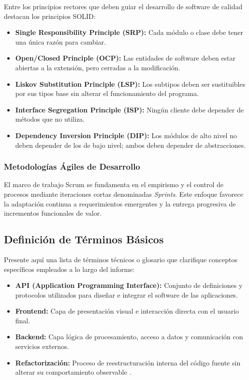 Entre los principios rectores que deben guiar el desarrollo de software de calidad destacan los principios SOLID:
\begin{itemize}
  \item \textbf{Single Responsibility Principle (SRP):} Cada módulo o clase debe tener una única razón para cambiar.
  \item \textbf{Open/Closed Principle (OCP):} Las entidades de software deben estar abiertas a la extensión, pero cerradas a la modificación.
  \item \textbf{Liskov Substitution Principle (LSP):} Los subtipos deben ser sustituibles por sus tipos base sin alterar el funcionamiento del programa.
  \item \textbf{Interface Segregation Principle (ISP):} Ningún cliente debe depender de métodos que no utiliza.
  \item \textbf{Dependency Inversion Principle (DIP):} Los módulos de alto nivel no deben depender de los de bajo nivel; ambos deben depender de abstracciones.
\end{itemize}

\subsubsection{Metodologías Ágiles de Desarrollo}
El marco de trabajo Scrum \citep{schwaber2020scrum} se fundamenta en el empirismo y el control de procesos mediante iteraciones cortas denominadas \textit{Sprints}. Este enfoque favorece la adaptación continua a requerimientos emergentes y la entrega progresiva de incrementos funcionales de valor.

\subsection{Definición de Términos Básicos}
Presente aquí una lista de términos técnicos o glosario que clarifique conceptos específicos empleados a lo largo del informe:
\begin{itemize}
  \item \textbf{API (Application Programming Interface):} Conjunto de definiciones y protocolos utilizados para diseñar e integrar el software de las aplicaciones.
  \item \textbf{Frontend:} Capa de presentación visual e interacción directa con el usuario final.
  \item \textbf{Backend:} Capa lógica de procesamiento, acceso a datos y comunicación con servicios externos.
  \item \textbf{Refactorización:} Proceso de reestructuración interna del código fuente sin alterar su comportamiento observable \citep{fowler2018refactoring}.
\end{itemize}
